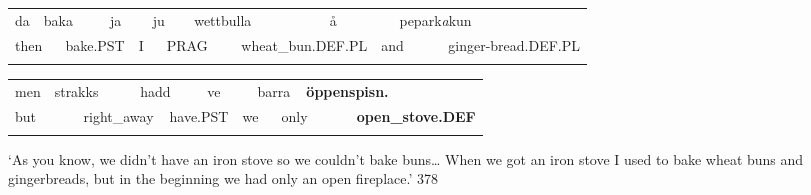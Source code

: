 \begin{tabular}{llllllllllllll}
\lsptoprule
da & \multicolumn{2}{l}{baka

} & \multicolumn{2}{l}{ja

} & \multicolumn{2}{l}{ju

} & \multicolumn{2}{l}{wettbulla

} & \multicolumn{2}{l}{å

} & \multicolumn{2}{l}{pepark\textit{a}kun

} & \\
\multicolumn{2}{l}{then

} & \multicolumn{2}{l}{bake.PST

} & \multicolumn{2}{l}{I

} & \multicolumn{2}{l}{PRAG

} & \multicolumn{2}{l}{wheat\_bun.DEF.PL

} & \multicolumn{2}{l}{and

} & \multicolumn{2}{l}{ginger-bread.DEF.PL

}\\
\lspbottomrule
\end{tabular}

\begin{tabular}{llllllllllll}
\lsptoprule
men & \multicolumn{2}{l}{strakks

} & \multicolumn{2}{l}{hadd

} & \multicolumn{2}{l}{ve

} & \multicolumn{2}{l}{barra

} & \multicolumn{2}{l}{{\bfseries öppenspisn.}

} & \\
\multicolumn{2}{l}{but

} & \multicolumn{2}{l}{right\_away

} & \multicolumn{2}{l}{have.PST

} & \multicolumn{2}{l}{we

} & \multicolumn{2}{l}{only

} & \multicolumn{2}{l}{{\bfseries open\_stove.DEF}

}\\
\lspbottomrule
\end{tabular}

\begin{styleTranslation}
‘As you know, we didn’t have an iron stove so we couldn’t bake buns… When we got an iron stove I used to bake wheat buns and gingerbreads, but in the beginning we had only an open fireplace.’ 378

\end{styleTranslation}

